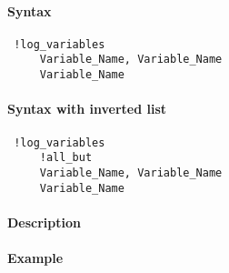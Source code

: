 


	\paragraph{Syntax}
 
 \begin{verbatim}
 !log_variables
     Variable_Name, Variable_Name
     Variable_Name
 \end{verbatim}
 
 \paragraph{Syntax with inverted list}
 
 \begin{verbatim}
 !log_variables
     !all_but
     Variable_Name, Variable_Name
     Variable_Name
 \end{verbatim}
 
 \paragraph{Description}
 
 \paragraph{Example}


